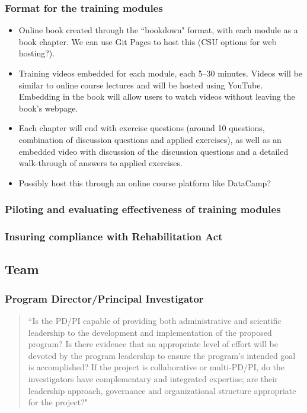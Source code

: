 \documentclass[pdftex,english,12pt,parskip=half]{scrartcl}
\begin{document}
\subsubsection{Format for the training modules}

\begin{itemize}
\item Online book created through the ``bookdown" format, with each module as a book chapter. We can use Git Pages to host this (CSU options for web hosting?).
\item Training videos embedded for each module, each 5--30 minutes. Videos will be similar to online course lectures and will be hosted using YouTube. Embedding in the book will allow users to watch videos without leaving the book's webpage. 
\item Each chapter will end with exercise questions (around 10 questions, combination of discussion questions and applied exercises), as well as an embedded video with discussion of the discussion questions and a detailed walk-through of answers to applied exercises. 
\item Possibly host this through an online course platform like DataCamp?
\end{itemize}

\subsubsection{Piloting and evaluating effectiveness of training modules}

\subsubsection{Insuring compliance with Rehabilitation Act}

\subsection{Team}

\subsubsection{Program Director/Principal Investigator}

\begin{quotation}
``Is the PD/PI capable of providing both administrative and scientific leadership to the development and implementation of the proposed program? Is there evidence that an appropriate level of effort will be devoted by the program leadership to ensure the program's intended goal is accomplished? If the project is collaborative or multi-PD/PI, do the investigators have complementary and integrated expertise; are their leadership approach, governance and organizational structure appropriate for the project?"
\end{quotation}
\end{document}
